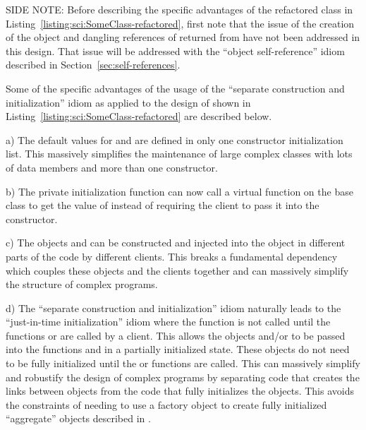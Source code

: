 \documentclass[pdf,ps2pdf,11pt]{SANDreport}
\begin{document}
SIDE NOTE: Before describing the specific advantages of the refactored
class in Listing~\ref{listing:sci:SomeClass-refactored}, first note
that the issue of the creation of the {} object and dangling
references of {} returned from {} have not been
addressed in this design.  That issue will be addressed with the
``object self-reference'' idiom described in
Section~\ref{sec:self-references}.

Some of the specific advantages of the usage of the ``separate
construction and initialization'' idiom as applied to the design of
{} shown in
Listing~\ref{listing:sci:SomeClass-refactored} are described below.

a) The default values for {} and {} are
defined in only one constructor initialization list.  This massively
simplifies the maintenance of large complex classes with lots of data
members and more than one constructor.

b) The private initialization function {}
can now call a virtual function on the base class
{} to get the value of
{} instead of requiring the client to pass it into the
constructor.

c) The objects {} and {} can be constructed and injected
into the {} object in different parts of the code by
different clients.  This breaks a fundamental dependency which couples
these objects and the clients together and can massively simplify the
structure of complex programs.

d) The ``separate construction and initialization'' idiom naturally
leads to the ``just-in-time initialization'' idiom where the
{} function is not called until the
functions {} or {} are called
by a client.  This allows the objects {} and/or {} to be
passed into the functions {}  and {} 
in a partially initialized state.  These objects do not need to be
fully initialized until the {} or
{} functions are called.  This can massively simplify
and robustify the design of complex programs by separating code that
creates the links between objects from the code that fully initializes
the objects.  This avoids the constraints of needing to use a factory
object to create fully initialized ``aggregate'' objects described in
{}\cite{DomainDrivenDesign}.
\end{document}
